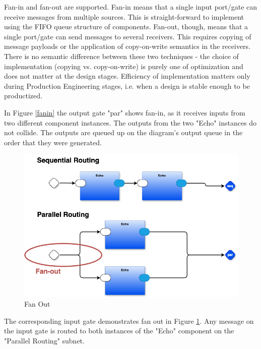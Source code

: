 \documentclass[10pt,anonymous,review]{acmart}
\begin{document}
Fan-in and fan-out are supported. Fan-in means that a single input port/gate can receive messages from multiple sources. This is straight-forward to implement using the FIFO queue structure of components. Fan-out, though, means that a single port/gate can send messages to several receivers. This requires copying of message payloads or the application of copy-on-write semantics in the receivers. There is no semantic difference between these two techniques - the choice of implementation (copying vs. copy-on-write) is purely one of optimization and does not matter at the design stages. Efficiency of implementation matters only during Production Engineering stages, i.e. when a design is stable enough to be productized.

In Figure \ref{fanin} the output gate "par" shows fan-in, as it receives inputs from two different component instances. The outputs from the two "Echo" instances do not collide. The outputs are queued up on the diagram's output queue in the order that they were generated.


  \begin{figure}
    \includegraphics[scale=0.2]{./media/fanout.png}
    \caption{Fan Out}
    \label{fanout}
  \end{figure}
The corresponding input gate demonstrates fan out in Figure \ref{fanout}. Any message on the input gate is routed to both instances of the "Echo" component on the "Parallel Routing" subnet.
\end{document}
